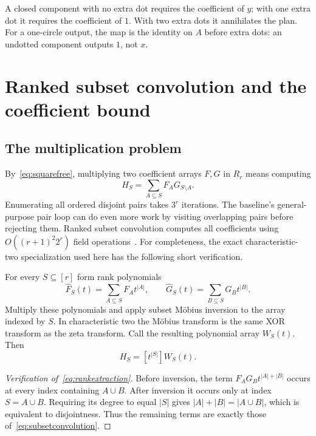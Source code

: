 \begin{example}
A closed component with no extra dot requires the coefficient of $y$;
with one extra dot it requires the coefficient of $1$. With two extra
dots it annihilates the plan. For a one-circle output, the map is the
identity on $A$ before extra dots: an undotted component outputs $1$,
not $x$.
\end{example}

\section{Ranked subset convolution and the coefficient bound}
\label{sec:convolution}

\subsection{The multiplication problem}

By~\eqref{eq:squarefree}, multiplying two coefficient arrays $F,G$ in
$R_r$ means computing
\begin{equation}
 H_S=\sum_{A\subseteq S}F_A G_{S\setminus A}.
 \label{eq:subsetconvolution}
\end{equation}
Enumerating all ordered disjoint pairs takes $3^r$ iterations. The
baseline's general-purpose pair loop can do even more work by visiting
overlapping pairs before rejecting them. Ranked subset convolution computes
all coefficients using $O((r+1)^2 2^r)$ field operations~\cite{bhkk}.
For completeness, the exact characteristic-two specialization used here
has the following short verification.

For every $S\subseteq[r]$ form rank polynomials
\[
 \widehat F_S(t)=\sum_{A\subseteq S}F_A t^{|A|},
 \qquad
 \widehat G_S(t)=\sum_{B\subseteq S}G_B t^{|B|}.
\]
Multiply these polynomials and apply subset M\"obius inversion to the
array indexed by $S$. In characteristic two the M\"obius transform is
the same XOR transform as the zeta transform. Call the resulting polynomial
array $W_S(t)$. Then
\begin{equation}
 H_S=[t^{|S|}]W_S(t).
 \label{eq:rankextraction}
\end{equation}

\begin{proof}[Verification of~\eqref{eq:rankextraction}]
Before inversion, the term $F_A G_B t^{|A|+|B|}$ occurs at every index
containing $A\cup B$. After inversion it occurs only at index
$S=A\cup B$. Requiring its degree to equal $|S|$ gives
$|A|+|B|=|A\cup B|$, which is equivalent to disjointness. Thus the
remaining terms are exactly those of~\eqref{eq:subsetconvolution}.
\end{proof}

